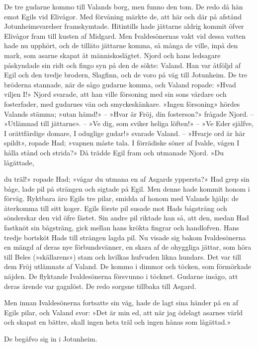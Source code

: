 De tre gudarne kommo till Valands borg, men funno den tom. De redo då
hän emot Egils vid Elivågor. Med förvåning märkte de, att här och där på
afstånd Jotunheimsvarelser framskymtade. Hitintills hade jättarne aldrig
kommit öfver Elivågor fram till kusten af Midgard. Men Ivaldesönernas
vakt vid dessa vatten hade nu upphört, och de tilläto jättarne komma, så
många de ville, inpå den mark, som asarne skapat åt människoslägtet.
Njord och hans ledsagare påskyndade sin ridt och fingo syn på den de
sökte: Valand. Han var åtföljd af Egil och den tredje brodern, Slagfinn,
och de voro på väg till Jotunheim. De tre bröderna stannade, när de sågo
gudarne komma, och Valand ropade: »Hvad viljen I!» Njord svarade, att
han ville försoning med sin sons vårdare och fosterfader, med gudarnes
vän och smyckeskänkare. »Ingen försoning» hördes Valands stämma; »utan
hämd!» -- »Hvar är Fröj, din fosterson?» frågade Njord. -- »Utlämnad
till jättarne». -- »Ve dig, som sviker heliga löften!» -- »Ve Eder
själfve, I orättfärdige domare, I oduglige gudar!» svarade Valand. --
»Hvarje ord är här spildt», ropade Had; »vapnen måste tala. I förrädiske
söner af Ivalde, vågen I hålla stånd och strida?» Då trädde Egil fram
och utmanade Njord. »Du lågättade,

du träl!» ropade Had; »vågar du utmana en af Asgards yppersta?» Had grep
sin båge, lade pil på strängen och sigtade på Egil. Men denne hade
kommit honom i förväg. Ryktbara äro Egils tre pilar, smidda af honom med
Valands hjälp: de återkomma till sitt koger. Egils förste pil susade mot
Hads bågsträng och sönderskar den vid öfre fästet. Sin andre pil riktade
han så, att den, medan Had fastknöt sin bågsträng, gick mellan hans
krökta fingrar och handlofven. Hans tredje bortsköt Hads till strängen
lagda pil. Nu visade sig bakom Ivaldesönerna en mängd af deras nye
förbundsvänner, en skara af de ohyggliga jättar, som höra till Beles
(»skällarens») stam och hvilkas hufvuden likna hundars. Det var till dem
Fröj utlämnats af Valand. De kommo i dimmor och töcken, som förmörkade
näjden. De flyktande Ivaldesönerna försvunno i töcknet. Gudarne insågo,
att deras ärende var gagnlöst. De redo sorgsne tillbaka till Asgard.

Men innan Ivaldesönerna fortsatte sin väg, hade de lagt sina händer på
en af Egils pilar, och Valand svor: »Det är min ed, att när jag ödelagt
asarnes värld och skapat en bättre, skall ingen heta träl och ingen
hånas som lågättad.»

De begåfvo sig in i Jotunheim.


